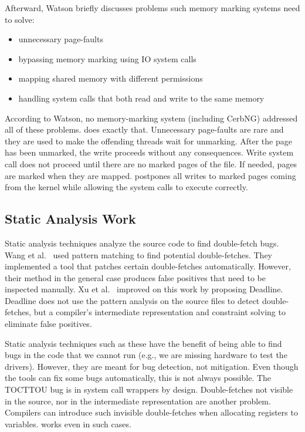 Afterward, Watson briefly discusses problems such memory marking systems
need to solve: 
\begin{itemize}
    \item unnecessary page-faults
    \item bypassing memory marking using IO system calls
    \item mapping shared memory with different permissions
    \item handling system calls that both read and write to the same memory
\end{itemize}

According to Watson, no memory-marking system (including CerbNG) addressed all
of these problems. \sysname does exactly that. Unnecessary page-faults are rare
and they are used to make the offending threads wait for unmarking. After the
page has been unmarked, the write proceeds without any consequences. Write
system call does not proceed until there are no marked pages of the file. If
needed, pages are marked when they are mapped. \sysname postpones all writes to
marked pages coming from the kernel while allowing the system calls to execute
correctly.

\subsection{Static Analysis Work}
\label{subsec:dfstatic}
Static analysis techniques analyze the source code to find double-fetch bugs.
Wang et al.~\cite{wang2017double} used pattern matching to find potential
double-fetches. They implemented a tool that patches certain double-fetches
automatically. However, their method in the general case produces false
positives that need to be inspected manually. Xu et al.~\cite{xu2018precise}
improved on this work by proposing Deadline. Deadline does not use the pattern 
analysis on the source files to detect double-fetches, but a compiler's
intermediate representation and constraint solving to eliminate false positives.

Static analysis techniques such as these have the benefit of being able to find
bugs in the code that we cannot run (e.g., we are missing hardware to test the
drivers). However, they are meant for bug detection, not mitigation. Even though
the tools can fix some bugs automatically, this is not always possible. The
TOCTTOU bug is in system call wrappers by design. Double-fetches not visible in
the source, nor in the intermediate representation are another problem.
Compilers can introduce such invisible double-fetches when allocating registers
to variables. \sysname works even in such cases.


